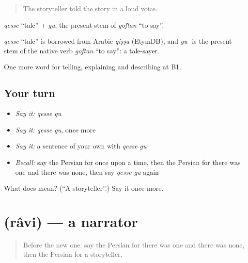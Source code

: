 \begin{quote}
The storyteller told the story in a loud voice.
\end{quote}

\emph{qesse} \textquotedblleft{}tale\textquotedblright{} + \emph{gu}, the present stem of \emph{goftan} \textquotedblleft{}to say\textquotedblright{}.

\begin{cousinweb}
\emph{qesse} \textquotedblleft{}tale\textquotedblright{} is borrowed from Arabic \emph{qiṣṣa} (EtymDB), and \emph{gu-} is the present stem of the native verb \emph{goftan} \textquotedblleft{}to say\textquotedblright{}: a tale-sayer.
\end{cousinweb}

\begin{grammarlens}[title={What you've built}]
One more word for telling, explaining and describing at B1.
\end{grammarlens}

\subsection*{Your turn}
\begin{itemize}
\raggedright
  \item \emph{Say it:} \emph{qesse gu}
  \item \emph{Say it:} \emph{qesse gu}, once more
  \item \emph{Say it:} a sentence of your own with \emph{qesse gu}
  \item \emph{Recall:} say the Persian for once upon a time, then the Persian for there was one and there was none, then say \emph{qesse gu} again
\end{itemize}

\begin{tcolorbox}[breakable,colback=teal!4,colframe=teal!35!black,title={Before you move on}]
What does   mean? (\textquotedblleft{}A storyteller\textquotedblright{}.) Say it once more.
\end{tcolorbox}
\section[\texorpdfstring{\fa{راوی} (râvi)}{راوی (râvi)}]{ (râvi) — a narrator}

\label{lesson:FA-C345-ravi}



\begin{quote}
Before the new one: say the Persian for there was one and there was none, then the Persian for a storyteller.
\end{quote}

